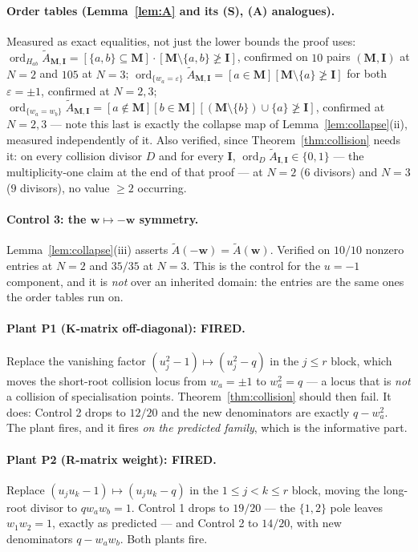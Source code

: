 \documentclass[11pt]{article}
\theoremstyle{plain}
\theoremstyle{definition}
\theoremstyle{remark}
\theoremstyle{plain}
\newcommand{\bI}{\mathbf{I}}
\newcommand{\bM}{\mathbf{M}}
\newcommand{\bw}{\mathbf{w}}
\newcommand{\At}{\widetilde{A}}
\newcommand{\ord}{\operatorname{ord}}
\begin{document}
\paragraph{Order tables (Lemma~\ref{lem:A} and its (S), (A) analogues).}
Measured as exact equalities, not just the lower bounds the proof uses:
$\ord_{H_{ab}}\At_{\bM,\bI}=[\{a,b\}\subseteq\bM]\cdot
[\bM\setminus\{a,b\}\not\ge\bI]$, confirmed on $10$ pairs $(\bM,\bI)$ at $N=2$
and $105$ at $N=3$;
$\ord_{\{w_a=\varepsilon\}}\At_{\bM,\bI}=[a\in\bM][\bM\setminus\{a\}\not\ge\bI]$
for both $\varepsilon=\pm1$, confirmed at $N=2,3$;
$\ord_{\{w_a=w_b\}}\At_{\bM,\bI}=[a\notin\bM][b\in\bM]
[(\bM\setminus\{b\})\cup\{a\}\not\ge\bI]$, confirmed at $N=2,3$ --- note this
last is exactly the collapse map of Lemma~\ref{lem:collapse}(ii), measured
independently of it.
Also verified, since Theorem~\ref{thm:collision} needs it: on every collision
divisor $D$ and for every $\bI$, $\ord_D\At_{\bI,\bI}\in\{0,1\}$ --- the
multiplicity-one claim at the end of that proof --- at $N=2$ ($6$ divisors) and
$N=3$ ($9$ divisors), no value $\ge2$ occurring.

\paragraph{Control 3: the $\bw\mapsto-\bw$ symmetry.}
Lemma~\ref{lem:collapse}(iii) asserts $\At(-\bw)=\At(\bw)$.  Verified on
\textbf{$10/10$} nonzero entries at $N=2$ and \textbf{$35/35$} at $N=3$.  This
is the control for the $u=-1$ component, and it is \emph{not} over an inherited
domain: the entries are the same ones the order tables run on.

\paragraph{Plant P1 (K-matrix off-diagonal): FIRED.}
Replace the vanishing factor $(u_j^2-1)\mapsto(u_j^2-q)$ in the $j\le r$ block,
which moves the short-root collision locus from $w_a=\pm1$ to $w_a^2=q$ --- a
locus that is \emph{not} a collision of specialisation points.
Theorem~\ref{thm:collision} should then fail.  It does: Control 2 drops to
$12/20$ and the new denominators are exactly $q-w_a^2$.  The plant fires, and it
fires \emph{on the predicted family}, which is the informative part.

\paragraph{Plant P2 (R-matrix weight): FIRED.}
Replace $(u_ju_k-1)\mapsto(u_ju_k-q)$ in the $1\le j<k\le r$ block, moving the
long-root divisor to $qw_aw_b=1$.  Control 1 drops to $19/20$ --- the
$\{1,2\}$ pole leaves $w_1w_2=1$, exactly as predicted --- and Control 2 to
$14/20$, with new denominators $q-w_aw_b$.  Both plants fire.
\end{document}
